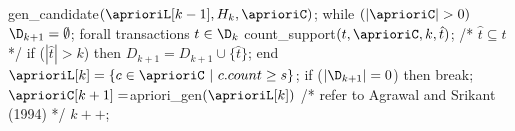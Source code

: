 gen_candidate$(\aprioriL[k-1], H_k, \aprioriC)$;
while $(|\aprioriC| > 0)$ {
	$\D_{k+1} = \emptyset$;
	forall transactions $t \in \D_k$
		count_support$(t, \aprioriC, k, \hat{t})$; /* $\hat{t}\subseteq t$ */
		if ($|\hat{t}|>k$) then $D_{k+1}=D_{k+1}\cup\{\hat{t}\}$;		
	end
	$\aprioriL[k] = \{c \in \aprioriC\ |\ c.count\geq s\}$;
	if ($|\D_{k+1}| = 0$) then break;
	$\aprioriC[k+1] = $apriori_gen$(\aprioriL[k])$ /* refer to Agrawal and Srikant (1994) */
	$k++$;
}